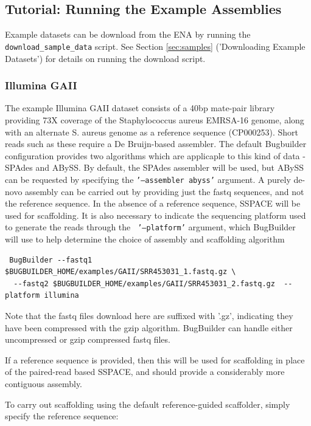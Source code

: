 \documentclass[a4paper,10pt]{article}
\begin{document}
\subsection{Tutorial: Running the Example Assemblies}

Example datasets can be download from the ENA by running the {\tt
download\_sample\_data} script. See Section \ref{sec:samples} ('Downloading 
Example Datasets') for details on running the download script. 

\subsubsection{Illumina GAII}

The example Illumina GAII dataset consists of a 40bp mate-pair library
providing 73X coverage of the Staphylococcus aureus EMRSA-16 genome, along with
an alternate S. aureus genome as a reference sequence (CP000253). Short reads
such as these require a De Bruijn-based assembler. The default Bugbuilder
configuration provides two algorithms which are  applicaple to this kind of
data - SPAdes and ABySS. By default, the SPAdes assembler will be used, but
ABySS can be requested by specifying the {\tt '--assembler abyss'} argument. A
purely de-novo assembly can be carried out by providing just the fastq
sequences, and not the reference sequence. In the absence of a reference
sequence, SSPACE will be used for scaffolding. It is also necessary to indicate
the sequencing platform used to generate the reads through the {\tt
'--platform'} argument, which BugBuilder will use to help determine the choice
of assembly and scaffolding algorithm 

\begin{verbatim}
 BugBuilder --fastq1 $BUGBUILDER_HOME/examples/GAII/SRR453031_1.fastq.gz \
  --fastq2 $BUGBUILDER_HOME/examples/GAII/SRR453031_2.fastq.gz  --platform illumina
\end{verbatim}

Note that the fastq files download here are suffixed with '.gz', indicating
they have been compressed with the gzip algorithm. BugBuilder can handle either
uncompressed or gzip compressed fastq files. 

If a reference sequence is provided, then this will be used for scaffolding in
place of the paired-read based SSPACE, and should provide a considerably more
contiguous assembly. 

To carry out scaffolding using the default reference-guided scaffolder, simply
specify the reference sequence:
\end{document}
